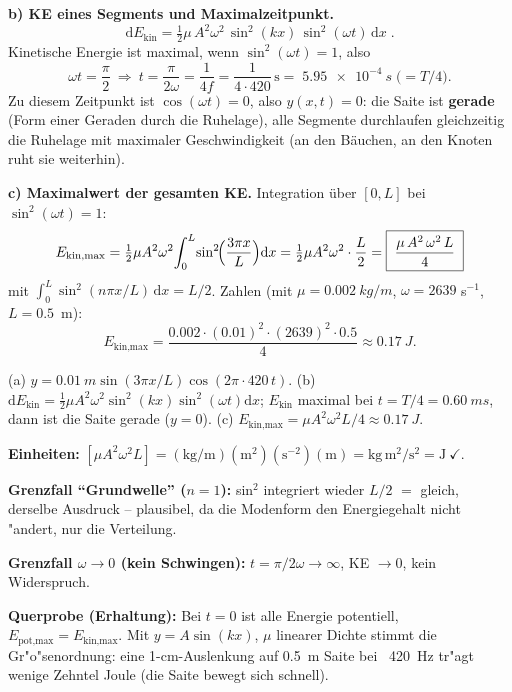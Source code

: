 \textbf{b) KE eines Segments und Maximalzeitpunkt.}
\begin{equation}
  \mathrm{d}E_{\text{kin}}
  =\tfrac12\mu\,A^2\omega^2\,\sin^2(kx)\,\sin^2(\omega t)\,\mathrm{d}x
  \;.
\end{equation}
Kinetische Energie ist maximal, wenn $\sin^2(\omega t)=1$, also
\begin{equation}
  \omega t=\frac{\pi}{2}\ \Rightarrow\ t=\frac{\pi}{2\omega}
  =\frac{1}{4f}=\frac{1}{4\cdot420}\,\mathrm{s}
  =\boxed{\;\qty{5.95e-4}{s}\;\bigl(=T/4\bigr)}.
\end{equation}
Zu diesem Zeitpunkt ist $\cos(\omega t)=0$, also $y(x,t)=0$: die Saite ist
\textbf{gerade} (Form einer Geraden durch die Ruhelage), alle Segmente
durchlaufen gleichzeitig die Ruhelage mit maximaler Geschwindigkeit (an den
Bäuchen, an den Knoten ruht sie weiterhin).

\textbf{c) Maximalwert der gesamten KE.} Integration über $[0,L]$ bei
$\sin^2(\omega t)=1$:
\begin{equation}
  E_{\text{kin,max}}
  =\tfrac12\mu A^2\omega^2
  \!\int_0^L\!\sin^2\!\Bigl(\frac{3\pi x}{L}\Bigr)\mathrm{d}x
  =\tfrac12\mu A^2\omega^2\cdot\frac{L}{2}
  =\boxed{\;\frac{\mu\,A^2\,\omega^2\,L}{4}\;}
\end{equation}
mit $\int_0^L\sin^2(n\pi x/L)\,\mathrm{d}x=L/2$. Zahlen (mit
$\mu=\qty{0.002}{kg/m}$, $\omega=2639$ s$^{-1}$, $L=0.5$~m):
\begin{equation}
  E_{\text{kin,max}}
  =\frac{0.002\cdot(0.01)^2\cdot(2639)^2\cdot0.5}{4}
  \approx\qty{0.17}{J}.
\end{equation}

\begin{ergebnis}
(a) $y=\qty{0.01}{m}\sin(3\pi x/L)\cos(2\pi\cdot420\,t)$.
(b) $\mathrm{d}E_{\text{kin}}=\frac12\mu A^2\omega^2\sin^2(kx)\sin^2(\omega t)\mathrm{d}x$;
$E_{\text{kin}}$ maximal bei $t=T/4=\qty{0.60}{ms}$, dann ist die Saite gerade
($y=0$). (c) $E_{\text{kin,max}}=\mu A^2\omega^2L/4\approx\qty{0.17}{J}$.
\end{ergebnis}

\begin{kontrolle}
\textbf{Einheiten:} $[\mu A^2\omega^2 L]=
(\mathrm{kg/m})(\mathrm{m^2})(\mathrm{s^{-2}})(\mathrm m)=\mathrm{kg\,m^2/s^2}
=\mathrm J\ \checkmark$.

\textbf{Grenzfall ``Grundwelle'' ($n=1$):} sin$^2$ integriert wieder $L/2$
$=$ gleich, derselbe Ausdruck -- plausibel, da die Modenform den
Energiegehalt nicht "andert, nur die Verteilung. \checkmark

\textbf{Grenzfall $\omega\rightarrow0$ (kein Schwingen):} $t=\pi/2\omega\to\infty
$, KE $\to0$, kein Widerspruch. \checkmark

\textbf{Querprobe (Erhaltung):} Bei $t=0$ ist alle Energie potentiell,
$E_{\text{pot,max}}=E_{\text{kin,max}}$. Mit $y=A\sin(kx)$, $\mu$ linearer
Dichte stimmt die Gr"o"senordnung: eine 1-cm-Auslenkung auf 0.5~m Saite bei
~420~Hz tr"agt wenige Zehntel Joule (die Saite bewegt sich schnell).
\checkmark
\end{kontrolle}

